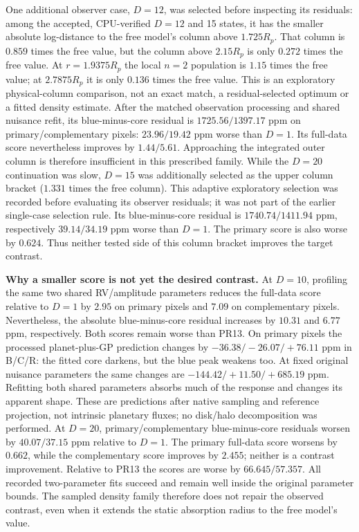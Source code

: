 One additional observer case, $D=12$, was selected before inspecting its
residuals: among the accepted, CPU-verified $D=12$ and 15 states, it has the
smaller absolute log-distance to the free model's column above $1.725R_p$.
That column is $0.859$ times the free value, but the column above $2.15R_p$
is only $0.272$ times the free value. At $r=1.9375R_p$ the local $n=2$
population is $1.15$ times the free value; at $2.7875R_p$ it is only $0.136$
times the free value. This is an exploratory physical-column comparison,
not an exact match, a residual-selected optimum or a fitted density estimate.
After the matched observation processing and shared nuisance refit, its
blue-minus-core residual is $1725.56/1397.17$ ppm on primary/complementary
pixels: $23.96/19.42$ ppm worse than $D=1$. Its full-data score nevertheless
improves by $1.44/5.61$. Approaching the integrated outer column is therefore
insufficient in this prescribed family.
While the $D=20$ continuation was slow, $D=15$ was additionally selected as
the upper column bracket ($1.331$ times the free column). This adaptive
exploratory selection was recorded before evaluating its observer residuals;
it was not part of the earlier single-case selection rule.
Its blue-minus-core residual is $1740.74/1411.94$ ppm, respectively
$39.14/34.19$ ppm worse than $D=1$. The primary score is also worse by
$0.624$. Thus neither tested side of this column bracket improves the
target contrast.

\textbf{Why a smaller score is not yet the desired contrast.}
At $D=10$, profiling the same two shared RV/amplitude parameters reduces
the full-data score relative to $D=1$ by $2.95$ on primary pixels and $7.09$
on complementary pixels. Nevertheless, the absolute blue-minus-core
residual increases by $10.31$ and $6.77$ ppm, respectively. Both scores
remain worse than PR13. On primary pixels the processed planet-plus-GP
prediction changes by $-36.38/-26.07/+76.11$ ppm in B/C/R: the fitted core
darkens, but the blue peak weakens too. At fixed original nuisance parameters
the same changes are $-144.42/+11.50/+685.19$ ppm. Refitting both shared
parameters absorbs much of the response and changes its apparent shape.
These are predictions after native sampling and reference projection, not
intrinsic planetary fluxes; no disk/halo decomposition was performed.
At $D=20$, primary/complementary blue-minus-core residuals worsen by
$40.07/37.15$ ppm relative to $D=1$. The primary full-data score worsens by
$0.662$, while the complementary score improves by $2.455$; neither is a
contrast improvement. Relative to PR13 the scores are worse by
$66.645/57.357$. All recorded two-parameter fits succeed and remain well
inside the original parameter bounds. The sampled density family therefore
does not repair the observed contrast, even when it extends the static
absorption radius to the free model's value.

